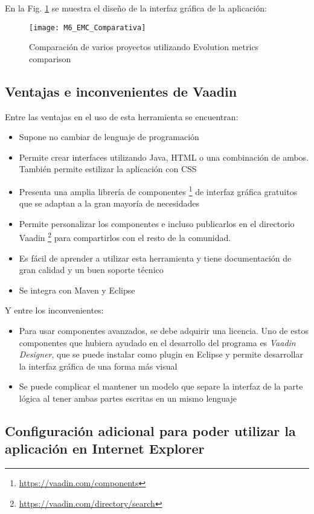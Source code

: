 En la Fig. \ref{fig:M5_InterfazEMG} se muestra el diseño de la interfaz gráfica de la aplicación:

\begin{figure}[!h]
	\centering
	\texttt{[image: M6\_EMC\_Comparativa]}
	\caption{Comparación de varios proyectos utilizando Evolution metrics comparison}\label{fig:M5_InterfazEMG}
\end{figure}
\FloatBarrier

\subsection{Ventajas e inconvenientes de Vaadin}
Entre las ventajas en el uso de esta herramienta se encuentran:
\begin{itemize}
	\item Supone no cambiar de lenguaje de programación
	\item Permite crear interfaces utilizando Java, HTML o una combinación de ambos. También permite estilizar la aplicación con CSS
	\item Presenta una amplia librería de componentes \footnote{\url{https://vaadin.com/components}} de interfaz gráfica gratuitos que se adaptan a la gran mayoría de necesidades
	\item Permite personalizar los componentes e incluso publicarlos en el directorio Vaadin \footnote{\url{https://vaadin.com/directory/search}} para compartirlos con el resto de la comunidad.
	\item Es fácil de aprender a utilizar esta herramienta y tiene documentación de gran calidad y un buen soporte técnico
	\item Se integra con Maven y Eclipse
\end{itemize}

Y entre los inconvenientes:
\begin{itemize}
	\item Para usar componentes avanzados, se debe adquirir una licencia. Uno de estos componentes que hubiera ayudado en el desarrollo del programa es \textit{Vaadin Designer}, que se puede instalar como plugin en Eclipse y permite desarrollar la interfaz gráfica de una forma más visual
	\item Se puede complicar el mantener un modelo que separe la interfaz de la parte lógica al tener ambas partes escritas en un mismo lenguaje
\end{itemize}

\subsection{Configuración adicional para poder utilizar la aplicación en Internet Explorer}

